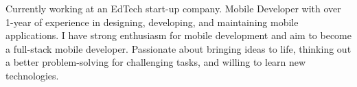 

\begin{cvparagraph}

Currently working at an EdTech start-up company. Mobile Developer with over 1-year of experience in designing, developing, and maintaining mobile applications. I have strong enthusiasm for mobile development and aim to become a full-stack mobile developer. Passionate about bringing ideas to life, thinking out a better problem-solving for challenging tasks, and willing to learn new technologies.
\end{cvparagraph}
